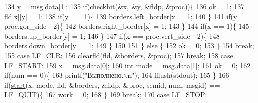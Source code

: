 \begin{DoxyCode}
{{{{134                         y = msg.data[1];
135                         \textcolor{keywordflow}{if}(\hyperlink{lifefld_8c_a33d22361defb8f49f54304fe19240abe}{checkhit}(&x, &y, &fldp, &proc))\{
136                             ok = 1;
137                             fld[x][y] = 1;
138                             \textcolor{keywordflow}{if}(y == 1)\{
139                                 borders.left\_border[x] = 1;
140                             \}
141                             \textcolor{keywordflow}{if}(y == proc.gor\_side - 2)\{
142                                 borders.right\_border[x] = 1;
143                             \}
144                             \textcolor{keywordflow}{if}(x == 1)\{
145                                 borders.up\_border[y] = 1;
146                             \}
147                             \textcolor{keywordflow}{if}(x == proc.vert\_side - 2)\{
148                                 borders.down\_border[y] = 1;
149                             \}
150 
151                         \} \textcolor{keywordflow}{else} \{
152                             ok = 0;
153                         \}
154                         \textcolor{keywordflow}{break};
155                     \textcolor{keywordflow}{case} \hyperlink{lifeop_8h_abc6126af1d45847bc59afa0aa3216b04a5a7c518bbf5563068423ad41f2c1c0a9}{LF\_CLR}:
156                         \hyperlink{lifeop_8c_a3f37c599f55a2b67ff121e6c37df7630}{clearfld}(fld, &borders, &proc);
157                         \textcolor{keywordflow}{break};
158                     \textcolor{keywordflow}{case} \hyperlink{lifeop_8h_abc6126af1d45847bc59afa0aa3216b04a3bec17b3914ed04bcaed9a1b52fcda5e}{LF\_START}:
159                         x = msg.data[0];
160                         \textcolor{keywordtype}{int} mode = msg.data[1];
161                         ok = 0;
162                         \textcolor{keywordflow}{if}(num == 0)\{
163                             printf(\textcolor{stringliteral}{"Выполнено.\(\backslash\)n"});
164                             fflush(stdout);
165                         \}
166                         \textcolor{keywordflow}{if}(\hyperlink{lifeop_8c_a67be292e3bb47697a2ce1391363c5298}{start}(x, mode, fld, &borders, &fldp, &proc, semid, num, msgid) == 
      \hyperlink{lifeop_8h_abc6126af1d45847bc59afa0aa3216b04a1f3f62ed200f104926f943260f8d79e9}{LF\_QUIT})\{
167                             work = 0;
168                         \}
169                         \textcolor{keywordflow}{break};
170                     \textcolor{keywordflow}{case} \hyperlink{lifeop_8h_abc6126af1d45847bc59afa0aa3216b04a4e2071e46b25d5073e4af7f2b215ba38}{LF\_STOP}:
}}}}
\end{DoxyCode}
